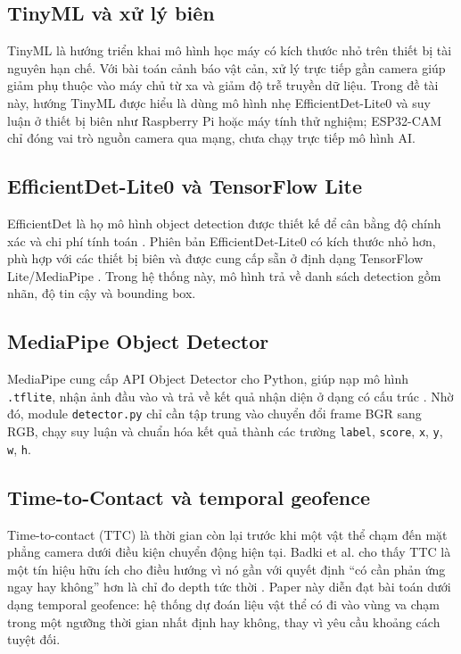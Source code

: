 \documentclass[twoside,final]{hcmut-report}
\begin{document}
\subsection{TinyML và xử lý biên}
TinyML là hướng triển khai mô hình học máy có kích thước nhỏ trên thiết bị tài nguyên hạn chế. Với bài toán cảnh báo vật cản, xử lý trực tiếp gần camera giúp giảm phụ thuộc vào máy chủ từ xa và giảm độ trễ truyền dữ liệu. Trong đề tài này, hướng TinyML được hiểu là dùng mô hình nhẹ EfficientDet-Lite0 và suy luận ở thiết bị biên như Raspberry Pi hoặc máy tính thử nghiệm; ESP32-CAM chỉ đóng vai trò nguồn camera qua mạng, chưa chạy trực tiếp mô hình AI.

\subsection{EfficientDet-Lite0 và TensorFlow Lite}
EfficientDet là họ mô hình object detection được thiết kế để cân bằng độ chính xác và chi phí tính toán \citep{tan2020efficientdet}. Phiên bản EfficientDet-Lite0 có kích thước nhỏ hơn, phù hợp với các thiết bị biên và được cung cấp sẵn ở định dạng TensorFlow Lite/MediaPipe \citep{tensorflowlite}. Trong hệ thống này, mô hình trả về danh sách detection gồm nhãn, độ tin cậy và bounding box.

\subsection{MediaPipe Object Detector}
MediaPipe cung cấp API Object Detector cho Python, giúp nạp mô hình \texttt{.tflite}, nhận ảnh đầu vào và trả về kết quả nhận diện ở dạng có cấu trúc \citep{mediapipeobjectdetector}. Nhờ đó, module \texttt{detector.py} chỉ cần tập trung vào chuyển đổi frame BGR sang RGB, chạy suy luận và chuẩn hóa kết quả thành các trường \texttt{label}, \texttt{score}, \texttt{x}, \texttt{y}, \texttt{w}, \texttt{h}.

\subsection{Time-to-Contact và temporal geofence}
Time-to-contact (TTC) là thời gian còn lại trước khi một vật thể chạm đến mặt phẳng camera dưới điều kiện chuyển động hiện tại. Badki et al. cho thấy TTC là một tín hiệu hữu ích cho điều hướng vì nó gần với quyết định ``có cần phản ứng ngay hay không'' hơn là chỉ đo depth tức thời \citep{badki2021binaryttc}. Paper này diễn đạt bài toán dưới dạng temporal geofence: hệ thống dự đoán liệu vật thể có đi vào vùng va chạm trong một ngưỡng thời gian nhất định hay không, thay vì yêu cầu khoảng cách tuyệt đối.
\end{document}
